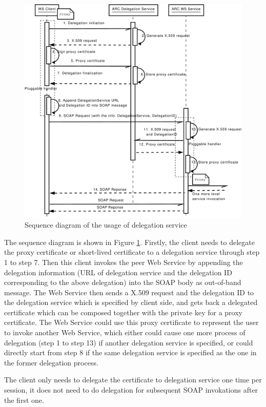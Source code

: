 \documentclass[conference]{IEEEtran}
\begin{document}
\begin{figure}
\includegraphics[width=1.0\columnwidth]{Delegation_UML.pdf}
\caption{Sequence diagram of the usage of delegation service}
\label{fig:DelegUML}
\end{figure}

The sequence diagram is shown in Figure \ref{fig:DelegUML}. Firstly, the client needs to delegate
the proxy certificate or short-lived certificate to a delegation service through step 1 to step 7.
Then this client invokes the peer Web Service by appending the delegation information (URL of delegation
service and the delegation ID corresponding to the above delegation) into the SOAP body as out-of-band 
message. The Web Service then sends a X.509 request and the delegation ID to the delegation service 
which is specified by client side, and gets back a delegated certificate which can be composed together
with the private key for a proxy certificate. The Web Service could use this proxy certificate 
to represent the user to invoke another Web Service, which either could cause one more process of 
delegation (step 1 to step 13) if another delegation service is specified, or could directly start
from step 8 if the same delegation service is specified as the one in the former delegation process.

The client only needs to delegate the certificate to delegation service one time per session, it does
not need to do delegation for subsequent SOAP invokations after the first one.
\end{document}
